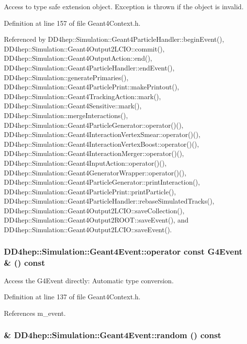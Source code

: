 Access to type safe extension object. Exception is thrown if the object is invalid. 

Definition at line 157 of file Geant4Context.h.

Referenced by DD4hep::Simulation::Geant4ParticleHandler::beginEvent(), DD4hep::Simulation::Geant4Output2LCIO::commit(), DD4hep::Simulation::Geant4OutputAction::end(), DD4hep::Simulation::Geant4ParticleHandler::endEvent(), DD4hep::Simulation::generatePrimaries(), DD4hep::Simulation::Geant4ParticlePrint::makePrintout(), DD4hep::Simulation::Geant4TrackingAction::mark(), DD4hep::Simulation::Geant4Sensitive::mark(), DD4hep::Simulation::mergeInteractions(), DD4hep::Simulation::Geant4ParticleGenerator::operator()(), DD4hep::Simulation::Geant4InteractionVertexSmear::operator()(), DD4hep::Simulation::Geant4InteractionVertexBoost::operator()(), DD4hep::Simulation::Geant4InteractionMerger::operator()(), DD4hep::Simulation::Geant4InputAction::operator()(), DD4hep::Simulation::Geant4GeneratorWrapper::operator()(), DD4hep::Simulation::Geant4ParticleGenerator::printInteraction(), DD4hep::Simulation::Geant4ParticlePrint::printParticle(), DD4hep::Simulation::Geant4ParticleHandler::rebaseSimulatedTracks(), DD4hep::Simulation::Geant4Output2LCIO::saveCollection(), DD4hep::Simulation::Geant4Output2ROOT::saveEvent(), and DD4hep::Simulation::Geant4Output2LCIO::saveEvent().\hypertarget{class_d_d4hep_1_1_simulation_1_1_geant4_event_aeecd69c0d548e5f307f01a94ac9ed132}{
\subsubsection[{operator const G4Event \&}]{\setlength{\rightskip}{0pt plus 5cm}DD4hep::Simulation::Geant4Event::operator const G4Event \& () const}}
\label{class_d_d4hep_1_1_simulation_1_1_geant4_event_aeecd69c0d548e5f307f01a94ac9ed132}


Access the G4Event directly: Automatic type conversion. 

Definition at line 137 of file Geant4Context.h.

References m\_\-event.\hypertarget{class_d_d4hep_1_1_simulation_1_1_geant4_event_a6d3669fb2ba85939926297de1eb160f7}{
\subsubsection[{random}]{\& DD4hep::Simulation::Geant4Event::random () const}}
\label{class_d_d4hep_1_1_simulation_1_1_geant4_event_a6d3669fb2ba85939926297de1eb160f7}


